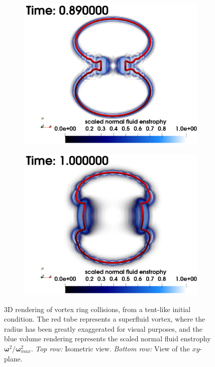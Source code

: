 \documentclass[%
 reprint,
 amsmath,amssymb,
 aps,
 prl,
]{revtex4-2}
\newcommand{\bom}{\boldsymbol{\omega}}
\begin{document}
\begin{figure}[t]
\begin{subfigure}[b]{0.24\textwidth}
		\includegraphics*[width=\textwidth]{snap-7.png}
	\end{subfigure}
    \begin{subfigure}[b]{0.24\textwidth}
		\centering
		\includegraphics*[width=\textwidth]{snap-8.png}
	\end{subfigure}



	\caption{3D rendering of vortex ring collisions, from a tent-like initial condition. The red tube represents a superfluid vortex, where the radius has been greatly exaggerated for visual purposes, and the blue volume rendering represents the scaled normal fluid enstrophy $\bom^2/\bom^2_{max}$. \emph{Top row:} Isometric view. \emph{Bottom row:} View of the $xy$-plane.}
	\label{fig: ring-coll-viz}
\end{figure}
\end{document}
